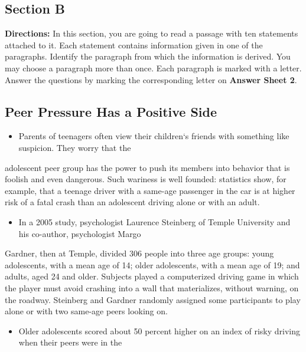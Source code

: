 \documentclass[UTF8,11pt]{ctexart}
\begin{document}
\subsection*{\textbf{Section B}}


\textbf{Directions:} In this section, you are going to read a passage with ten statements attached to it. Each statement contains information given in one of the paragraphs. Identify the paragraph from which the information is derived. You may choose a paragraph more than once. Each paragraph is marked with a letter. Answer the questions by marking the corresponding letter on\textbf{ Answer Sheet 2}.


\subsection*{\textbf{Peer Pressure Has a Positive Side}}


\begin{itemize}[leftmargin=2em,itemsep=.2em,topsep=.4em]\item[A.] Parents of teenagers often view their children‘s friends with something like suspicion. They worry that the
\end{itemize}

adolescent peer group has the power to push its members into behavior that is foolish and even dangerous. Such wariness is well founded: statistics show, for example, that a teenage driver with a same-age passenger in the car is at higher risk of a fatal crash than an adolescent driving alone or with an adult.


\begin{itemize}[leftmargin=2em,itemsep=.2em,topsep=.4em]\item[B.] In a 2005 study, psychologist Laurence Steinberg of Temple University and his co-author, psychologist Margo
\end{itemize}

Gardner, then at Temple, divided 306 people into three age groups: young adolescents, with a mean age of 14; older adolescents, with a mean age of 19; and adults, aged 24 and older. Subjects played a computerized driving game in which the player must avoid crashing into a wall that materializes, without warning, on the roadway. Steinberg and Gardner randomly assigned some participants to play alone or with two same-age peers looking on.


\begin{itemize}[leftmargin=2em,itemsep=.2em,topsep=.4em]\item[C.] Older adolescents scored about 50 percent higher on an index of risky driving when their peers were in the
\end{itemize}
\end{document}
